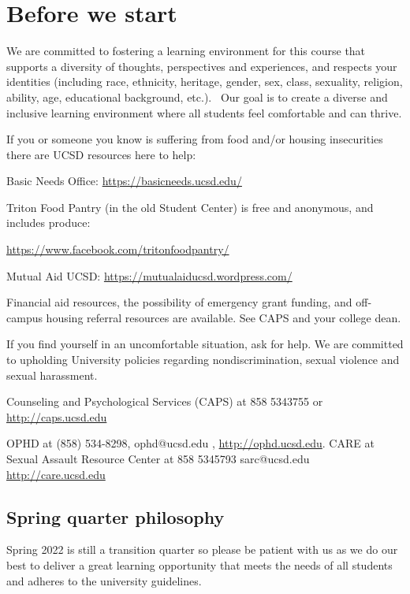 \documentclass[12pt, oneside]{article}
\begin{document}
\begin{flushright}
\end{flushright} 
\section*{Before we start}

We are committed to fostering a learning environment for this course that supports a diversity of thoughts, 
perspectives and experiences, and respects your identities (including race, ethnicity, heritage, gender, sex, 
class, sexuality, religion, ability, age, educational background, etc.).  
Our goal is to create a diverse and inclusive learning environment where all students feel comfortable and can thrive. 

If you or someone you know is suffering from food and/or housing insecurities 
there are UCSD resources here to help:

Basic Needs Office: \href{https://basicneeds.ucsd.edu/}{https://basicneeds.ucsd.edu/}

Triton Food Pantry (in the old Student Center)
is free and anonymous, and includes produce: 

\href{https://www.facebook.com/tritonfoodpantry/}{https://www.facebook.com/tritonfoodpantry/}

Mutual Aid UCSD: \href{https://mutualaiducsd.wordpress.com/}{https://mutualaiducsd.wordpress.com/}

Financial aid resources, the possibility of emergency grant funding, and off-campus housing referral 
resources are available. See CAPS and your college dean.

If you find yourself in an uncomfortable situation, ask for help. 
We are committed to upholding University policies regarding nondiscrimination, sexual violence and sexual harassment.

Counseling and Psychological Services (CAPS) at 858 5343755 or \href{http://caps.ucsd.edu}{http://caps.ucsd.edu}


OPHD at (858) 534-8298, ophd@ucsd.edu , \href{http://ophd.ucsd.edu}{http://ophd.ucsd.edu}. 
CARE at Sexual Assault Resource Center at 858 5345793 sarc@ucsd.edu \href{http://care.ucsd.edu}{http://care.ucsd.edu}

\subsection*{Spring quarter philosophy}
Spring 2022 is still a transition quarter so please be patient with us as we do our best 
to deliver a great learning opportunity that meets the needs of all students and adheres to the university guidelines. 
\end{document}
